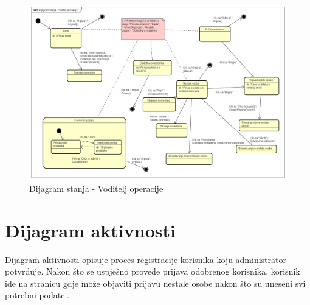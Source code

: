 			\begin{figure}[H]
				\includegraphics[width=\linewidth]{dijagrami/Dijagram stanja - Voditelj operacije.png}
				\caption{Dijagram stanja - Voditelj operacije}
			\end{figure}
   
			\eject 
		
		\section{Dijagram aktivnosti}


                Dijagram aktivnosti opisuje proces registracije korisnika koju administrator potvrđuje. Nakon što se uspješno provede prijava odobrenog korisnika, korisnik ide na stranicu gdje može objaviti prijavu nestale osobe nakon što su uneseni svi potrebni podatci.
            
